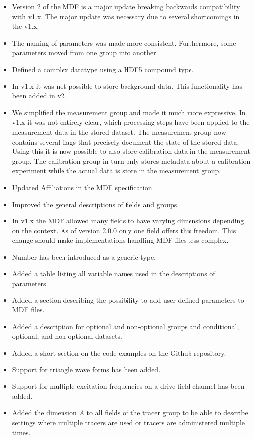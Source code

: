 \documentclass[landscape,a4paper]{article} %
\newcommand{\inlvar}[1]{{\ttfamily#1}}
\begin{document}
\begin{multicols}{2}
\begin{itemize}
	\item Version 2 of the MDF is a major update breaking backwards compatibility with v1.x. The major update was necessary due to several shortcomings in the v1.x.
	\item The naming of parameters was made more consistent. Furthermore, some parameters moved from one group into another.
	\item Defined a complex datatype using a HDF5 compound type. 
	\item In v1.x it was not possible to store background data. This functionality has been added in v2.
	\item We simplified the measurement group and made it much more expressive. In v1.x it was not entirely clear, which processing steps have been applied to the measurement data in the stored dataset. The \inlvar{measurement} group now contains several flags that precisely document the state of the stored data. Using this it is now possible to also store calibration data in the \inlvar{measurement} group. The calibration group in turn only stores metadata about a calibration experiment while the actual data is store in the measurement group.
	\item Updated Affiliations in the MDF specification.
	\item Improved the general descriptions of fields and groups.
	\item In v1.x the MDF allowed many fields to have varying dimensions depending on the context. As of version 2.0.0 only one field offers this freedom. This change should make implementations handling MDF files less complex.
	\item \inlvar{Number} has been introduced as a generic type. 
	\item Added a table listing all variable names used in the descriptions of parameters.
	\item Added a section describing the possibility to add user defined parameters to MDF files.
	\item Added a description for optional and non-optional groups and conditional, optional, and non-optional datasets.
    \item Added a short section on the code examples on the Github repository.
	\item Support for triangle wave forms has been added.
	\item Support for multiple excitation frequencies on a drive-field channel has been added.
	\item Added the dimension $A$ to all fields of the \inlvar{tracer} group to be able to describe settings where multiple tracers are used or tracers are administered multiple times.

\end{itemize}
\end{multicols}
\end{document}
